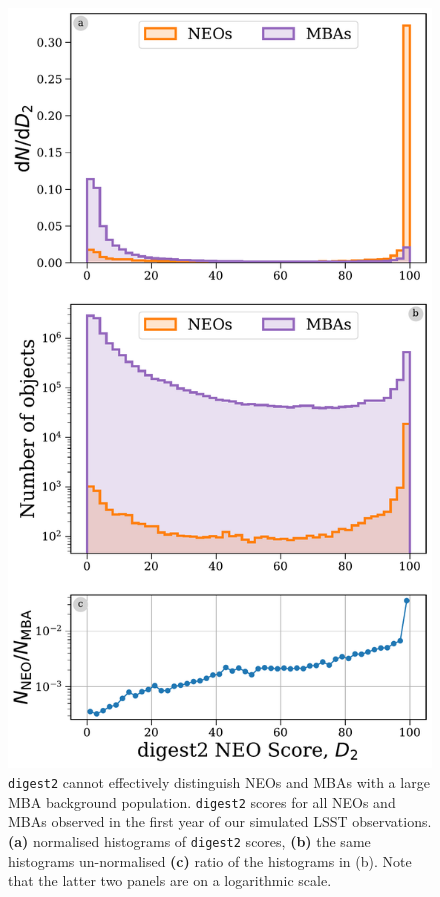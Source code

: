 \documentclass[twocolumn]{aastex631}
\newcommand{\dig}{\texttt{digest2}}
\begin{document}
\begin{figure}[htb]
    \centering
    \includegraphics[width=\columnwidth]{digest2_pollution.pdf}
    \caption{\dig{} cannot effectively distinguish NEOs and MBAs with a large MBA background population. \dig{} scores for all NEOs and MBAs observed in the first year of our simulated LSST observations. \textbf{(a)} normalised histograms of \dig{} scores, \textbf{(b)} the same histograms un-normalised \textbf{(c)} ratio of the histograms in (b). Note that the latter two panels are on a logarithmic scale.}
    \label{fig:digest2_should_be_scared}
\end{figure}
\end{document}
